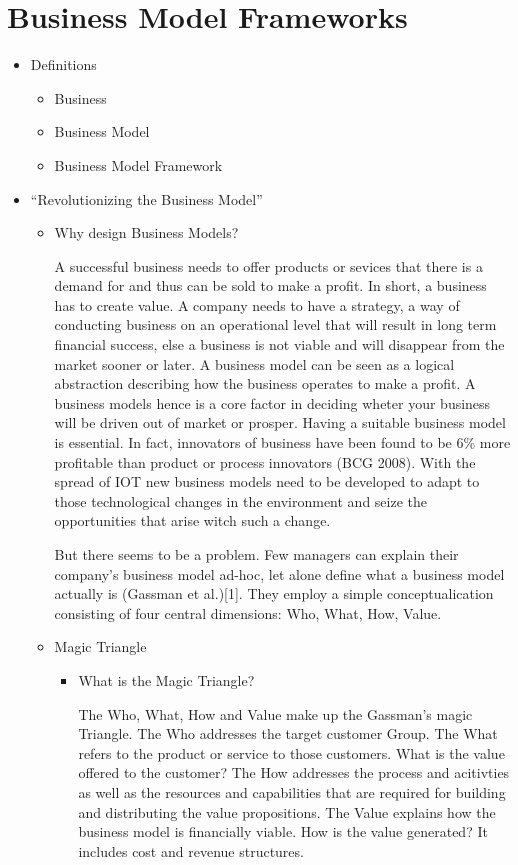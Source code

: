 \section{Business Model Frameworks}
	\begin{itemize}
		\item Definitions \cite{bmc} \cite{dijkman}
			\begin{itemize}
				\item Business 
				\item Business Model 
				\item Business Model Framework
			\end{itemize}
		\item ``Revolutionizing the Business Model'' \cite{gassmann}
			\begin{itemize}
				\item Why design Business Models?
				
				A successful business needs to offer products or sevices that there is a demand for and thus can be sold to make a profit. In short, a business has to create value. A company needs to have a strategy, a way of conducting business on an operational level that will result in long term financial success, else a business is not viable and will disappear from the market sooner or later.
				A business model can be seen as a logical abstraction describing how the business operates to make a profit. A business models hence is a core factor in deciding wheter your business will be driven out of market or prosper. Having a suitable business model is essential. In fact, innovators of business have been found to be 6\% more profitable than product or process innovators (BCG 2008). With the spread of IOT new business models need to be developed to adapt to those technological changes in the environment and seize the opportunities that arise witch such a change. 

				But there seems to be a problem. Few managers can explain their company's business model ad-hoc, let alone define what a business model actually is (Gassman et al.)[1]. They employ a simple conceptualication consisting of four central dimensions: Who, What, How, Value. 

				\item Magic Triangle 
				\begin{itemize}
					\item What is the Magic Triangle?

					The Who, What, How and Value make up the Gassman's magic Triangle. 
					The Who addresses the target customer Group. 
					The What refers to the product or service to those customers. What is the value offered to the customer? 
					The How addresses the process and acitivties as well as the resources and capabilities that are required for building and distributing the value propositions.
					The Value explains how the business model is financially viable. How is the value generated? It includes cost and revenue structures.
					

\end{itemize}
\end{itemize}
\end{itemize}
